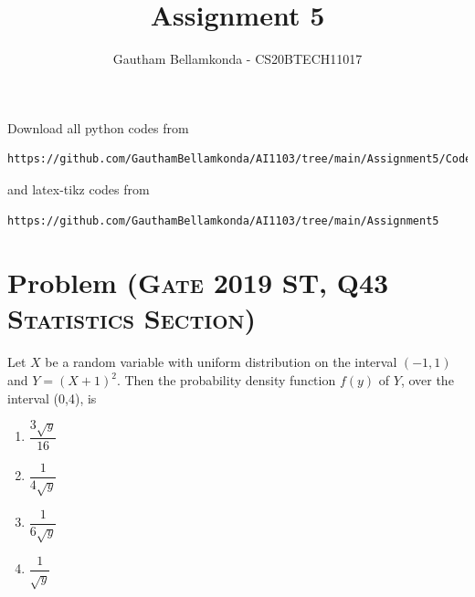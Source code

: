\documentclass[journal,12pt,twocolumn]{IEEEtran}
\begin{document}
     \def\rightbox#1{\makebox[0in][r]{#1}}
     \def\centbox#1{\makebox[0in]{#1}}
     \def\topbox#1{\raisebox{-\baselineskip}[0in][0in]{#1}}
     \def\midbox#1{\raisebox{-0.5\baselineskip}[0in][0in]{#1}}
\vspace{3cm}
\title{Assignment 5}
\author{Gautham Bellamkonda - CS20BTECH11017}
\maketitle
\newpage
\bigskip
\renewcommand{\thefigure}{\theenumi}
\renewcommand{\thetable}{\theenumi}
Download all python codes from 
\begin{lstlisting}
https://github.com/GauthamBellamkonda/AI1103/tree/main/Assignment5/Codes
\end{lstlisting}
and latex-tikz codes from 
\begin{lstlisting}
https://github.com/GauthamBellamkonda/AI1103/tree/main/Assignment5
\end{lstlisting}
\section{Problem (\textsc{Gate 2019 ST, Q43 Statistics Section})}
 Let $X$ be a random variable with uniform distribution on the interval $(-1, 1)$ and $Y=(X + 1)^2$. Then the probability density function $f(y)$ of $Y$, over the interval (0,4), is 
\begin{enumerate}
\item $\dfrac{3\sqrt{y}}{16}$ \\
\item $\dfrac{1}{4\sqrt{y}}$ \\
\item $\dfrac{1}{6\sqrt{y}}$ \\
\item $\dfrac{1}{\sqrt{y}}$ 
\end{enumerate}
\end{document}
